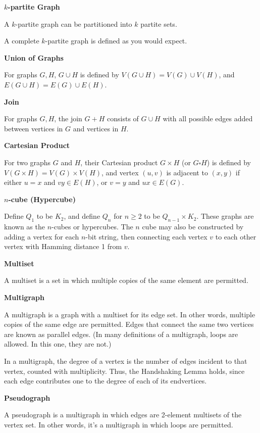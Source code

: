 \documentclass{article}
\begin{document}
\medskip\noindent\textbf{$k$-partite Graph}

    A $k$-partite graph can be partitioned into $k$ partite sets.

    A complete $k$-partite graph is defined as you would expect.

\medskip\noindent\textbf{Union of Graphs}

    For graphs $G, H$, $G \cup H$ is defined by $V(G \cup H) = V(G) \cup V(H)$, and $E(G \cup H) = E(G) \cup E(H)$.

\medskip\noindent\textbf{Join}

    For graphs $G, H$, the join $G + H$ consists of $G \cup H$ with all possible edges added between vertices in $G$ and vertices in $H$.

\medskip\noindent\textbf{Cartesian Product}

    For two graphs $G$ and $H$, their Cartesian product $G \times H$ (or $G \square H$) is defined by $V(G \times H) = V(G) \times V(H)$, and vertex $(u,v)$ is adjacent to $(x,y)$ if either $u=x$ and $vy \in E(H)$, or $v=y$ and $ux \in E(G)$.

\medskip\noindent\textbf{$n$-cube (Hypercube)}

    Define $Q_1$ to be $K_2$, and define $Q_n$ for $n \geq 2$ to be $Q_{n-1} \times K_2$.
    These graphs are known as the $n$-cubes or hypercubes.
    The $n$ cube may also be constructed by adding a vertex for each $n$-bit string, then connecting each vertex $v$ to each other vertex with Hamming distance 1 from $v$.

\medskip\noindent\textbf{Multiset}

    A multiset is a set in which multiple copies of the same element are permitted.

\medskip\noindent\textbf{Multigraph}

    A multigraph is a graph with a multiset for its edge set. In other words, multiple copies of the same edge are permitted. Edges that connect the same two vertices are known as parallel edges. (In many definitions of a multigraph, loops are allowed. In this one, they are not.)

    In a multigraph, the degree of a vertex is the number of edges incident to that vertex, counted with multiplicity. Thus, the Handshaking Lemma holds, since each edge contributes one to the degree of each of its endvertices.

\medskip\noindent\textbf{Pseudograph}

    A pseudograph is a multigraph in which edges are 2-element multisets of the vertex set. In other words, it's a multigraph in which loops are permitted.
\end{document}
